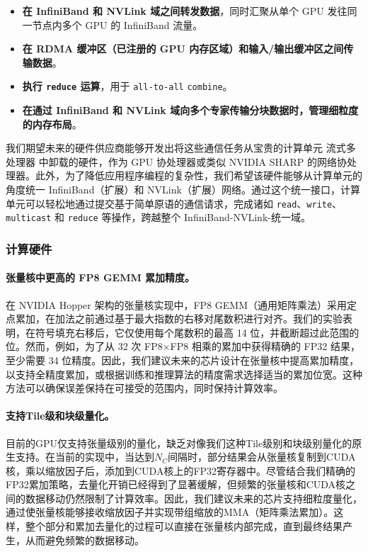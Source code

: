 \documentclass[lang=cn,a4paper,newtx]{elegantpaper}
\begin{document}
\begin{itemize}[topsep=0pt]
    \item
    \textbf{在 InfiniBand 和 NVLink 域之间转发数据}，同时汇聚从单个 GPU 发往同一节点内多个 GPU 的 InfiniBand 流量。
    \item 
    \textbf{在 RDMA 缓冲区（已注册的 GPU 内存区域）和输入/输出缓冲区之间传输数据}。
    \item 
    \textbf{执行 \texttt{reduce} 运算}，用于 \texttt{all-to-all} \texttt{combine}。
    \item
    \textbf{在通过 InfiniBand 和 NVLink 域向多个专家传输分块数据时，管理细粒度的内存布局}。
\end{itemize}

我们期望未来的硬件供应商能够开发出将这些通信任务从宝贵的计算单元 流式多处理器 中卸载的硬件，作为 GPU 协处理器或类似 NVIDIA SHARP 的网络协处理器。此外，为了降低应用程序编程的复杂性，我们希望该硬件能够从计算单元的角度统一 InfiniBand（扩展）和 NVLink（扩展）网络。通过这个统一接口，计算单元可以轻松地通过提交基于简单原语的通信请求，完成诸如 \texttt{read}、\texttt{write}、\texttt{multicast} 和 \texttt{reduce} 等操作，跨越整个 InfiniBand-NVLink-统一域。

\subsubsection{计算硬件}

\paragraph{张量核中更高的 FP8 GEMM 累加精度。}
在 NVIDIA Hopper 架构的张量核实现中，FP8 GEMM（通用矩阵乘法）采用定点累加，在加法之前通过基于最大指数的右移对尾数积进行对齐。我们的实验表明，在符号填充右移后，它仅使用每个尾数积的最高 14 位，并截断超过此范围的位。然而，例如，为了从 32 次 FP8$\times$FP8 相乘的累加中获得精确的 FP32 结果，至少需要 34 位精度。因此，我们建议未来的芯片设计在张量核中提高累加精度，以支持全精度累加，或根据训练和推理算法的精度需求选择适当的累加位宽。这种方法可以确保误差保持在可接受的范围内，同时保持计算效率。

\paragraph{支持Tile级和块级量化。}
目前的GPU仅支持张量级别的量化，缺乏对像我们这种Tile级别和块级别量化的原生支持。在当前的实现中，当达到$N_C$间隔时，部分结果会从张量核复制到CUDA核，乘以缩放因子后，添加到CUDA核上的FP32寄存器中。尽管结合我们精确的FP32累加策略，去量化开销已经得到了显著缓解，但频繁的张量核和CUDA核之间的数据移动仍然限制了计算效率。因此，我们建议未来的芯片支持细粒度量化，通过使张量核能够接收缩放因子并实现带组缩放的MMA（矩阵乘法累加）。这样，整个部分和累加去量化的过程可以直接在张量核内部完成，直到最终结果产生，从而避免频繁的数据移动。
\end{document}
